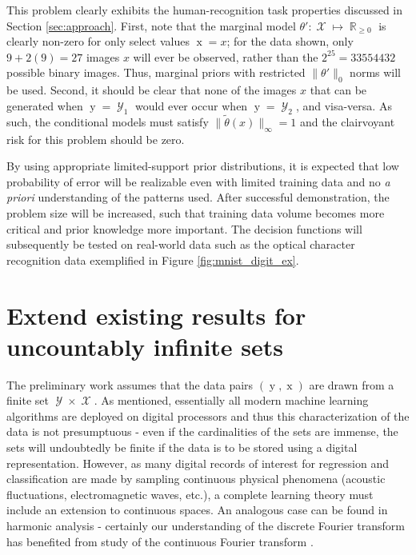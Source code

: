 \documentclass[12pt]{report}
\DeclareMathOperator{\xrm}{\mathrm{x}}
\DeclareMathOperator{\yrm}{\mathrm{y}}
\DeclareMathOperator{\Xcal}{\mathcal{X}}
\DeclareMathOperator{\Ycal}{\mathcal{Y}}
\DeclareMathOperator{\Rbb}{\mathbb{R}}
\begin{document}
This problem clearly exhibits the human-recognition task properties discussed in Section \ref{sec:approach}. First, note that the marginal model $\theta': \Xcal \mapsto \Rbb_{\geq 0}$ is clearly non-zero for only select values $\xrm = x$; for the data shown, only $9+2(9) = 27$ images $x$ will ever be observed, rather than the $2^{25} = 33554432$ possible binary images. Thus, marginal priors with restricted $\big\| \theta' \big\|_0$ norms will be used. Second, it should be clear that none of the images $x$ that can be generated when $\yrm = \Ycal_1$ would ever occur when $\yrm = \Ycal_2$, and visa-versa. As such, the conditional models must satisfy $\big\| \tilde{\theta}(x) \big\|_{\infty} = 1$ and the clairvoyant risk for this problem should be zero.

By using appropriate limited-support prior distributions, it is expected that low probability of error will be realizable even with limited training data and no \emph{a priori} understanding of the patterns used. After successful demonstration, the problem size will be increased, such that training data volume becomes more critical and prior knowledge more important. The decision functions will subsequently be tested on real-world data such as the optical character recognition data \cite{lecun-mnist} exemplified in Figure \ref{fig:mnist_digit_ex}.
 




\section{Extend existing results for uncountably infinite sets}

The preliminary work assumes that the data pairs $(\yrm,\xrm)$ are drawn from a finite set $\Ycal \times \Xcal$. As mentioned, essentially all modern machine learning algorithms are deployed on digital processors and thus this characterization of the data is not presumptuous - even if the cardinalities of the sets are immense, the sets will undoubtedly be finite if the data is to be stored using a digital representation. However, as many digital records of interest for regression and classification are made by sampling continuous physical phenomena (acoustic fluctuations, electromagnetic waves, etc.), a complete learning theory must include an extension to continuous spaces. An analogous case can be found in harmonic analysis - certainly our understanding of the discrete Fourier transform has benefited from study of the continuous Fourier transform \cite{mallat-tour}.
\end{document}
